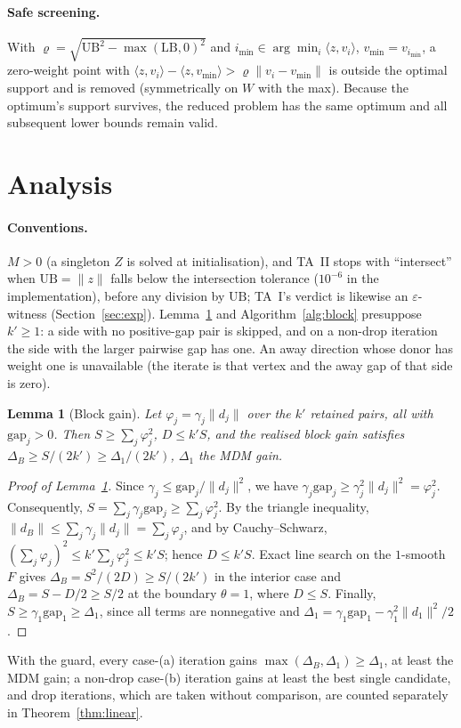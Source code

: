 \documentclass[pdflatex,sn-apa]{sn-jnl}%
\newtheorem{lemma}[theorem]{Lemma}
\theoremstyle{thmstyleone}
\newtheorem{lemma}[theorem]{Lemma}
\theoremstyle{thmstyletwo}
\newcommand{\ip}[2]{\langle #1, #2 \rangle}
\newcommand{\norm}[1]{\lVert #1 \rVert}
\newcommand{\UB}{\mathrm{UB}}
\newcommand{\LB}{\mathrm{LB}}
\begin{document}
\paragraph{Safe screening.} With $\varrho=\sqrt{\UB^2-\max(\LB,0)^2}$ and
$i_{\min}\in\arg\min_i\ip{z}{v_i}$, $v_{\min}=v_{i_{\min}}$, a zero-weight point with
$\ip{z}{v_i}-\ip{z}{v_{\min}}>\varrho\norm{v_i-v_{\min}}$ is outside the
optimal support and is removed (symmetrically on $W$ with the max).
Because the optimum's support survives, the reduced problem has the
same optimum and all subsequent lower bounds remain valid.

\section{Analysis}\label{sec:theory}

\paragraph{Conventions.} $M>0$ (a singleton $Z$ is solved at
initialisation), and TA~II stops with ``intersect'' when
$\UB=\norm z$ falls below the intersection tolerance ($10^{-6}$ in the
implementation), before any division by $\UB$; TA~I's verdict is
likewise an $\varepsilon$-witness (Section~\ref{sec:exp}). Lemma~\ref{lem:block}
and Algorithm~\ref{alg:block} presuppose $k'\ge1$: a side with no
positive-gap pair is skipped, and on a non-drop iteration the side with
the larger pairwise gap has one. An away direction whose donor has
weight one is unavailable (the iterate is that vertex and the away gap
of that side is zero).

\begin{lemma}[Block gain]\label{lem:block}
Let $\varphi_j=\gamma_j\norm{d_j}$ over the $k'$ retained pairs, all with
$\mathrm{gap}_j>0$. Then $S\ge\sum_j\varphi_j^2$, $D\le k'S$, and
the realised block gain satisfies
$\Delta_B\ge S/(2k')\ge\Delta_1/(2k')$, $\Delta_1$ the MDM gain.
\end{lemma}
\begin{proof}[Proof of Lemma~\ref{lem:block}]
Since $\gamma_j\le\mathrm{gap}_j/\norm{d_j}^2$, we have
$\gamma_j\mathrm{gap}_j\ge\gamma_j^2\norm{d_j}^2=\varphi_j^2$. Consequently,
$S=\sum_j\gamma_j\mathrm{gap}_j\ge\sum_j\varphi_j^2$. By the triangle
inequality, $\norm{d_B}\le\sum_j\gamma_j\norm{d_j}=\sum_j\varphi_j$, and by
Cauchy--Schwarz, $(\sum_j\varphi_j)^2\le k'\sum_j\varphi_j^2\le k'S$; hence
$D\le k'S$. Exact line search on the $1$-smooth $F$ gives
$\Delta_B=S^2/(2D)\ge S/(2k')$ in the interior case and
$\Delta_B=S-D/2\ge S/2$ at the boundary $\theta=1$, where $D\le S$. Finally,
$S\ge\gamma_1\mathrm{gap}_1\ge\Delta_1$, since all terms
are nonnegative and
$\Delta_1=\gamma_1\mathrm{gap}_1-\gamma_1^2\norm{d_1}^2/2$.
\end{proof}
With the guard, every case-(a) iteration gains
$\max(\Delta_B,\Delta_1)\ge\Delta_1$, at least the MDM gain; a non-drop
case-(b) iteration gains at least the best single candidate, and drop
iterations, which are taken without comparison, are counted separately
in Theorem~\ref{thm:linear}.
\end{document}

